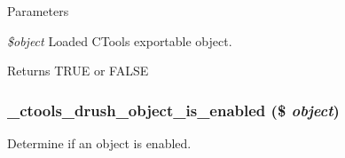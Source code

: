 \begin{DoxyParams}{Parameters}
\item[{\em \$object}]Loaded CTools exportable object.\end{DoxyParams}
\begin{DoxyReturn}{Returns}
TRUE or FALSE 
\end{DoxyReturn}
\hypertarget{ctools_8drush_8inc_ae679f0bbeb2c782f356abaa73059f951}{
\subsubsection[{\_\-ctools\_\-drush\_\-object\_\-is\_\-enabled}]{\setlength{\rightskip}{0pt plus 5cm}\_\-ctools\_\-drush\_\-object\_\-is\_\-enabled (\$ {\em object})}}
\label{ctools_8drush_8inc_ae679f0bbeb2c782f356abaa73059f951}
Determine if an object is enabled.

